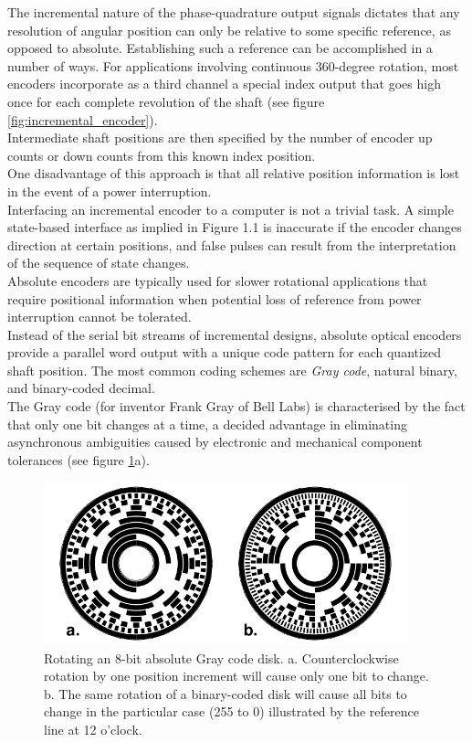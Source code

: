 The incremental nature of the phase-quadrature output signals dictates that
any resolution of angular position can only be relative to some specific
reference, as opposed to absolute. Establishing such a reference can be
accomplished in a number of ways. For applications involving continuous
360-degree rotation, most encoders incorporate as a third channel a special
index output that goes high once for each complete revolution of the shaft
(see figure \ref{fig:incremental_encoder}).
\\
Intermediate shaft positions are then specified by the number of encoder
up counts or down counts from this known index position.
\\
One disadvantage of this approach is that all relative position information
is lost in the event of a power interruption.
\\
Interfacing an incremental encoder to a computer is not a trivial task.
A simple state-based interface as implied in Figure 1.1 is inaccurate if
the encoder changes direction at certain positions, and false pulses can
result from the interpretation of the sequence of state changes.
\\
Absolute encoders are typically used for slower rotational applications
that require positional information when potential loss of reference
from power interruption cannot be tolerated.
\\
Instead of the serial bit streams of incremental designs, absolute optical
encoders provide a parallel word output with a unique code pattern for each
quantized shaft position. The most common coding schemes are \textit{Gray code},
natural binary, and binary-coded decimal.
\\
The Gray code (for inventor Frank Gray of Bell Labs) is characterised by the
fact that only one bit changes at a time, a decided advantage in eliminating
asynchronous ambiguities caused by electronic and mechanical component tolerances
(see figure \ref{fig:absolute_encoder}a).
\begin{figure} [h]
  \begin{center}
    \includegraphics[width=300pt]{img/absolute_encoder.png}
    \caption{Rotating an 8-bit absolute Gray code disk.
      a. Counterclockwise rotation by one position increment will cause
      only one bit to change.
      b. The same rotation of a binary-coded disk will cause all bits to
      change in the particular case (255 to 0) illustrated by the
      reference line at 12 o'clock.}
    \label{fig:absolute_encoder}
  \end{center}
\end{figure}
